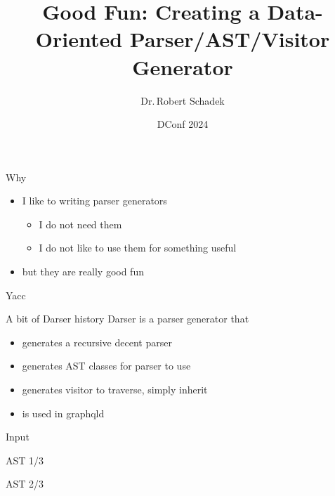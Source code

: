 \documentclass[aspectratio=169,notes]{beamer}
\title{Good Fun: Creating a Data-Oriented Parser/AST/Visitor Generator}
\date{DConf 2024}
\author{Dr.\,Robert Schadek}
\begin{document}
	\maketitle

	\begin{frame}[fragile]{Why}
		\begin{itemize}
			\item I like to writing parser generators
			\pause
			\begin{itemize}
				\item I do not need them
				\item I do not like to use them for something useful
			\end{itemize}
			\item but they are really good fun
		\end{itemize}
	\end{frame}

	\begin{frame}[fragile]{Yacc}
		
	\end{frame}

	\begin{frame}[fragile]{A bit of Darser history}
		Darser is a parser generator that
		\begin{itemize}
			\item generates a recursive decent parser
			\item generates AST classes for parser to use
			\item generates visitor to traverse, simply inherit
			\item is used in graphqld
		\end{itemize}
	\end{frame}

	\begin{frame}[fragile]{Input}
		
	\end{frame}

	\begin{frame}[fragile]{AST 1/3}
		
	\end{frame}

	\begin{frame}[fragile]{AST 2/3}
		
	\end{frame}
\end{document}
